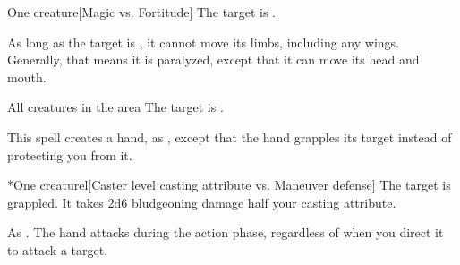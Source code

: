\begin{spellheader}
    \spellrng{\rngmed}
    \spelldur{\durshort}
\end{spellheader}
\begin{spelleffects}
    \begin{spelltarget}{One creature}[Magic vs. Fortitude]
        \spellsuccess The target is \staggered.

        As long as the target is \bloodied, it cannot move its limbs, including any wings. Generally, that means it is paralyzed, except that it can move its head and mouth.
    \end{spelltarget}
\end{spelleffects}

\begin{spellheader}
    \spelldur{\durmed}
\end{spellheader}
\begin{spelleffects}
    \begin{spelltargets}{All creatures in the area}
        The target is \vulnerable.
    \end{spelltargets}
\end{spelleffects}

\begin{spellheader}
    \spellrng{\rngmed}
    \spelldur{\durshort \dismissable}
\end{spellheader}
\begin{spelleffects}
    \spelleffect This spell creates a hand, as , except that the hand grapples its target instead of protecting you from it.
    \begin{spelltarget}*{One creature}l[Caster level \add casting attribute vs. Maneuver defense]
        \spellsuccess The target is grappled. It takes 2d6 bludgeoning damage \add half your casting attribute.
    \end{spelltarget}
\end{spelleffects}
\begin{spellfooter}
    \spellnotes As . The hand attacks during the action phase, regardless of when you direct it to attack a target.
\end{spellfooter}

